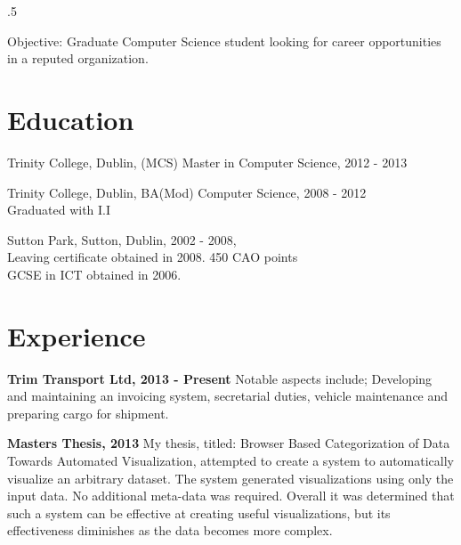 \documentclass{res}
\begin{document}
 

\thispagestyle{empty} %
\pagestyle{empty}
\address{14 Strand Road\\
Sutton\\
Dublin 13\\
00 353 86 3807768\\
divines@tcd.ie}






\begin{resume}
\vspace{0.1in}
\moveleft.5\sectionwidth\centerline{Objective: Graduate Computer Science student looking for career opportunities in a reputed organization.}  


\section{Education}
\vspace{0.1in} 

    Trinity College, Dublin, (MCS) Master in Computer Science, 2012 - 2013
 
    Trinity College, Dublin, BA(Mod) Computer Science, 2008 - 2012\\ 
    Graduated with I.I
 
    Sutton Park, Sutton, Dublin, 2002 - 2008,\\
    Leaving certificate obtained in 2008. 450 CAO points \\
    GCSE in ICT obtained in 2006.\\
    

\section{Experience} 
\vspace{0.1in}

    {\bf Trim Transport Ltd, 2013 - Present} Notable aspects include; Developing and maintaining an invoicing system, secretarial duties, vehicle maintenance and preparing cargo for shipment.

    {\bf Masters Thesis, 2013} My thesis, titled: Browser Based Categorization of Data Towards Automated Visualization, attempted to create a system to automatically visualize an arbitrary dataset. The system generated visualizations using only the input data. No additional meta-data was required. Overall it was determined that such a system can be effective at creating useful visualizations, but its effectiveness diminishes as the data becomes more complex.



\end{resume}
\end{document}
